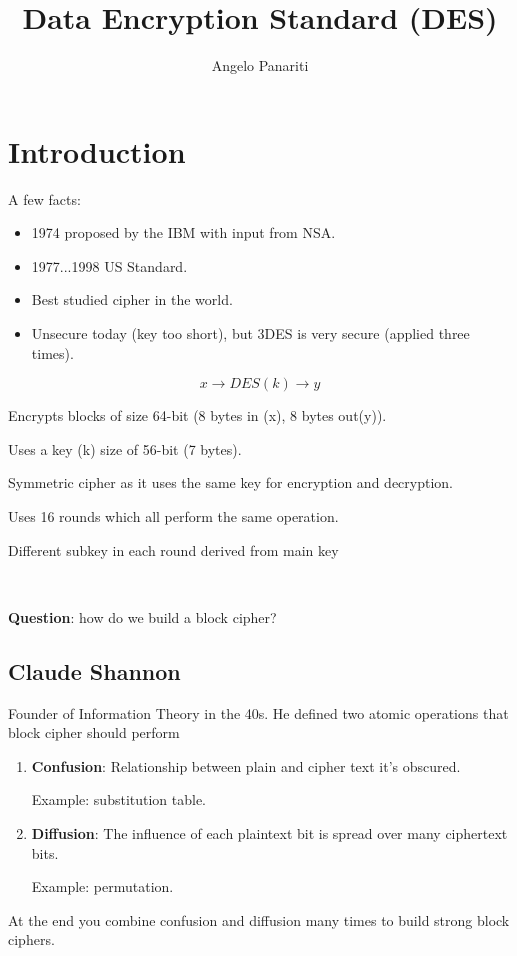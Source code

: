 \documentclass[twoside, twocolumn]{article}
\title{Data Encryption Standard (DES)}
\author{Angelo Panariti}
\begin{document}
\maketitle
\centerofcontents
\section{Introduction}

A few facts:
\begin{itemize}
    \item
        1974 proposed by the IBM with input from NSA.
    \item
        1977...1998 US Standard.
    \item
        Best studied cipher in the world.
    \item
        Unsecure today (key too short), but 3DES is very secure (applied three times).
\end{itemize}
$$x \rightarrow DES(k) \rightarrow y$$

Encrypts blocks of size 64-bit (8 bytes in (x), 8 bytes out(y)).

Uses a key (k) size of 56-bit (7 bytes).

Symmetric cipher as it uses the same key for encryption and decryption.

Uses 16 rounds which all perform the same operation. 

Different subkey in each round derived from main key

\

\textbf{Question}: how do we build a block cipher?

\subsection{Claude Shannon} Founder of Information Theory in the 40s. He defined two atomic operations that block cipher should perform
\begin{enumerate}
    \item
        \textbf{Confusion}: Relationship between plain and cipher text it's obscured.

        Example: substitution table.
    \item
    \textbf{Diffusion}: The influence of each plaintext bit is spread over many ciphertext bits.

        Example: permutation.

\end{enumerate}

At the end you combine confusion and diffusion many times to build strong block ciphers.
\end{document}
